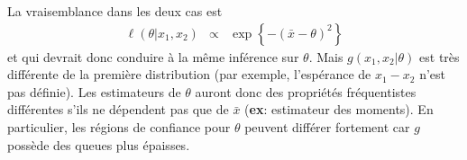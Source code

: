 \begin{rep} %
La vraisemblance dans les deux cas est
\begin{eqnarray*}
\ell(\theta|x_1,x_2) & \propto & \exp\left\{-(\bar{x}-\theta)^2\right\}
\end{eqnarray*}
et qui devrait donc conduire à la m\^eme inférence sur $\theta$. Mais $g(x_1,x_2|\theta)$ est très différente de la première distribution (par exemple, l'espérance de $x_1-x_2$ n'est pas définie). Les estimateurs de $\theta$ auront donc des propriétés fréquentistes différentes s'ils ne dépendent pas que de $\bar{x}$ {({\bf ex}: estimateur des moments)}. En particulier, les régions de confiance pour $\theta$ peuvent différer fortement car $g$ possède des queues plus épaisses. 
\end{rep}